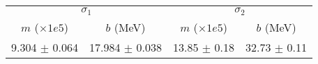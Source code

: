 \begin{tabular}{cc|cc}
\multicolumn{2}{c|}{$\sigma_1$} & \multicolumn{2}{|c}{$\sigma_2$} \\
$m$ ($\times1e5$) & $b$ (MeV) & $m$ ($\times1e5$) & $b$ (MeV) \\
\hline
9.304 $\pm$ 0.064 & 17.984 $\pm$ 0.038 & 13.85 $\pm$ 0.18 & 32.73 $\pm$ 0.11\\
\end{tabular}
